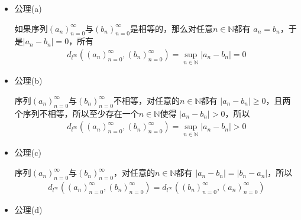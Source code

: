 \documentclass{article}
\begin{document}
\begin{itemize}
      \item 公理(a)

            如果序列$(a_n)_{n=0}^\infty$与$(b_n)_{n=0}^\infty$是相等的，那么对任意$n \in \mathbb{N}$都有
            $a_n = b_n$，于是$|a_n - b_n| = 0$，所有
            \begin{align*}
                  d_{l^\infty}((a_n)_{n = 0}^\infty, (b_n)_{n = 0}^\infty) = \sup \limits_{n \in \mathbb{N}} |a_n - b_n| = 0
            \end{align*}

      \item 公理(b)

            序列$(a_n)_{n=0}^\infty$与$(b_n)_{n=0}^\infty$不相等，对任意的$n \in \mathbb{N}$都有
            $|a_n - b_n| \geq 0$，且两个序列不相等，所以至少存在一个$n \in \mathbb{N}$使得
            $|a_n - b_n| > 0$，所以
            \begin{align*}
                  d_{l^\infty}((a_n)_{n = 0}^\infty, (b_n)_{n = 0}^\infty) = \sup \limits_{n \in \mathbb{N}} |a_n - b_n| > 0
            \end{align*}

      \item 公理(c)

            序列$(a_n)_{n=0}^\infty$与$(b_n)_{n=0}^\infty$，对任意的$n \in \mathbb{N}$都有
            $|a_n - b_n| = |b_n - a_n|$，所以
            \begin{align*}
                  d_{l^\infty}((a_n)_{n = 0}^\infty, (b_n)_{n = 0}^\infty) = d_{l^\infty}((b_n)_{n = 0}^\infty, (a_n)_{n = 0}^\infty)
            \end{align*}

      \item 公理(d)


\end{itemize}
\end{document}
